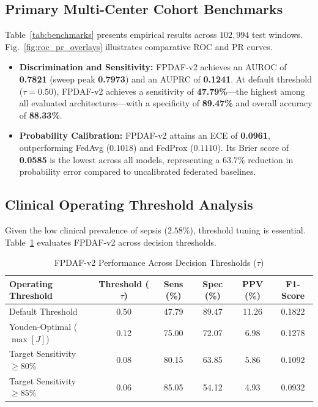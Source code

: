 \documentclass[10pt,a4paper,twocolumn,twoside]{article}
\begin{document}
\subsection{Primary Multi-Center Cohort Benchmarks}
Table~\ref{tab:benchmarks} presents empirical results across $102,994$ test windows. Fig.~\ref{fig:roc_pr_overlays} illustrates comparative ROC and PR curves.
\begin{itemize}
    \item \textbf{Discrimination and Sensitivity:} FPDAF-v2 achieves an AUROC of \textbf{0.7821} (sweep peak \textbf{0.7973}) and an AUPRC of \textbf{0.1241}. At default threshold ($\tau=0.50$), FPDAF-v2 achieves a sensitivity of \textbf{47.79\%}—the highest among all evaluated architectures—with a specificity of \textbf{89.47\%} and overall accuracy of \textbf{88.33\%}.
    \item \textbf{Probability Calibration:} FPDAF-v2 attains an ECE of \textbf{0.0961}, outperforming FedAvg ($0.1018$) and FedProx ($0.1110$). Its Brier score of \textbf{0.0585} is the lowest across all models, representing a $63.7\%$ reduction in probability error compared to uncalibrated federated baselines.
\end{itemize}

\subsection{Clinical Operating Threshold Analysis}
Given the low clinical prevalence of sepsis ($2.58\%$), threshold tuning is essential. Table~\ref{tab:thresholds} evaluates FPDAF-v2 across decision thresholds.

\begin{table}[t]
\centering
\small
\caption{FPDAF-v2 Performance Across Decision Thresholds ($\tau$)}
\label{tab:thresholds}
\begin{tabular}{lccccc}
\toprule
\textbf{Operating Threshold} & \textbf{Threshold ($\tau$)} & \textbf{Sens (\%)} & \textbf{Spec (\%)} & \textbf{PPV (\%)} & \textbf{F1-Score} \\
\midrule
Default Threshold & 0.50 & 47.79 & 89.47 & 11.26 & 0.1822 \\
Youden-Optimal ($\max [J]$) & 0.12 & 75.00 & 72.07 & 6.98 & 0.1278 \\
Target Sensitivity $\ge 80\%$ & 0.08 & 80.15 & 63.85 & 5.86 & 0.1092 \\
Target Sensitivity $\ge 85\%$ & 0.06 & 85.05 & 54.12 & 4.93 & 0.0932 \\
\bottomrule
\end{tabular}
\end{table}
\end{document}
